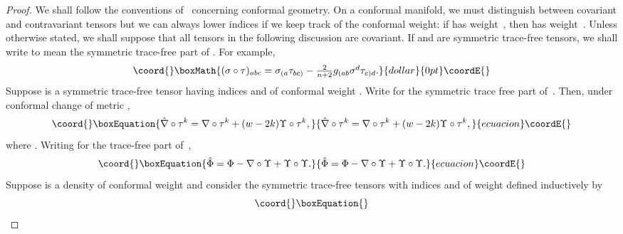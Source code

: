 \documentclass[a4paper,12pt]{amsart}
\begin{document}
\renewcommand{\proofname}{Proof of Theorem~\ref{betterthanexistence}}
\begin{proof}
We shall follow the conventions of~\cite{beg} concerning
conformal geometry.
On a conformal manifold, we must distinguish \mbox{between}
covariant and contravariant tensors but we can always lower indices if we keep
track of the conformal weight: if \coordHE{} has weight~\coordHE{}, then \coordHE{}
has weight~\coordHE{}. Unless otherwise stated, we shall suppose that all tensors in
the following discussion are covariant. If \myHighlight{$\sigma$}\coordHE{} and \myHighlight{$\tau$}\coordHE{} are symmetric
trace-free tensors, we shall write \myHighlight{$\sigma\circ\tau$}\coordHE{} to mean the symmetric
trace-free part of \myHighlight{$\sigma\otimes\tau$}\coordHE{}. For example,
$$\coord{}\boxMath{\textstyle(\sigma\circ\tau)_{abc}=
\sigma_{(a}\tau_{bc)}-\frac{2}{n+2}g_{(ab}\sigma^d\tau_{c)d}.}{dollar}{0pt}\coordE{}$$
Suppose \coordHE{} is a symmetric trace-free tensor having \coordHE{} indices and of
conformal weight \coordHE{}. Write \coordHE{} for the symmetric trace free
part of~\coordHE{}. Then, under conformal change of metric
\coordHE{},
\begin{equation}\coord{}\boxEquation{\label{change}
\hat\nabla\circ\tau^k=\nabla\circ\tau^k+(w-2k)\Upsilon\circ\tau^k,
}{\hat\nabla\circ\tau^k=\nabla\circ\tau^k+(w-2k)\Upsilon\circ\tau^k,
}{ecuacion}\coordE{}\end{equation}
where \coordHE{}.
Writing \coordHE{} for the trace-free part of~\coordHE{},
\begin{equation}\coord{}\boxEquation{\label{changeinPhi}
\hat\Phi=\Phi-\nabla\circ\Upsilon+\Upsilon\circ\Upsilon.}{\hat\Phi=\Phi-\nabla\circ\Upsilon+\Upsilon\circ\Upsilon.}{ecuacion}\coordE{}\end{equation}
Suppose \coordHE{} is a density of conformal weight \coordHE{}
and consider the symmetric trace-free tensors \coordHE{} with \coordHE{} indices and of
weight \coordHE{} defined inductively by
\begin{equation}\coord{}\boxEquation{\label{defoftau}
}
\end{equation}
\end{proof}
\end{document}
